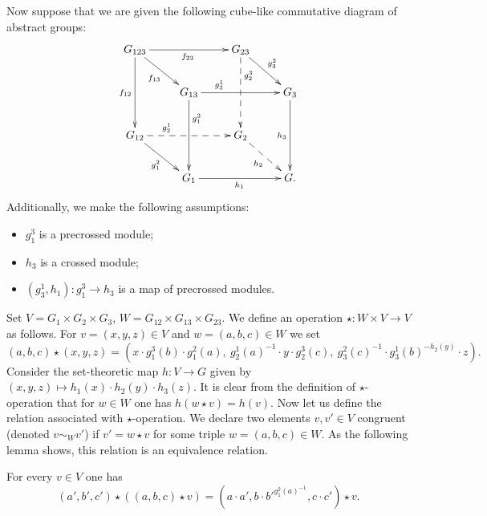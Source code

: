 Now suppose that we are given the following cube-like commutative diagram of abstract groups:
\begin{equation} \label{eq:cube} \begin{split} \xymatrix{
    G_{123} \ar[rr]_{f_{23}} \ar[dd]_{f_{12}} \ar[rd]_{f_{13}} &                        & G_{23} \ar@{-->}[dd]^(.3){g_2^3} \ar[rd]^{g^2_3} &           \\
    & G_{13} \ar[rr]^(.3){g^1_3} \ar^(.3){g^3_1}[dd] &                   & G_3 \ar[dd]_{h_3} \\
    G_{12} \ar@{-->}[rr]^(.3){g_2^1} \ar[rd]_{g_1^2}          &                        & G_2 \ar@{-->}[rd]_{h_2}         &           \\
    & G_1 \ar[rr]_{h_1}              &                   & G.} \end{split} \end{equation}
Additionally, we make the following assumptions:
\begin{itemize}
    \item $g_1^3$ is a precrossed module;
    \item $h_3$ is a crossed module;
    \item $(g_3^1, h_1) \colon g_1^3 \to h_3$ is a map of precrossed modules.
\end{itemize}
Set $V = G_1 \times G_2 \times G_3$, $W = G_{12} \times G_{13} \times G_{23}$.
We define an operation $\star \colon W \times V \to V$ as follows.
For $v = (x, y, z) \in V$ and $w = (a, b, c) \in W$ we set
\[(a, b, c) \star (x, y, z) = (x \cdot g_1^3(b) \cdot g_1^2(a),\ g_2^1(a)^{-1} \cdot y \cdot g_2^3(c),\ g_3^2(c)^{-1} \cdot g_3^1(b)^{-h_2(y)} \cdot z).\]
Consider the set-theoretic map $h \colon V \to G$ given by $(x, y, z) \mapsto h_1(x) \cdot h_2(y) \cdot h_3(z)$.
It is clear from the definition of $\star$-operation that for $w \in W$ one has $h(w \star v) = h(v).$
Now let us define the relation associated with $\star$-operation.
We declare two elements $v, v' \in V$ congruent (denoted $v \sim_W v'$) if $v' = w \star v$ for some triple $w=(a, b, c) \in W$.
As the following lemma shows, this relation is an equivalence relation.
\begin{lemma} For every $v \in V$ one has
\begin{equation*}(a', b', c') \star \left( (a, b, c) \star v \right) = (a \cdot a', b \cdot {b'}^{g_1^2(a)^{-1}}, c \cdot c') \star v.\end{equation*}
\end{lemma}
